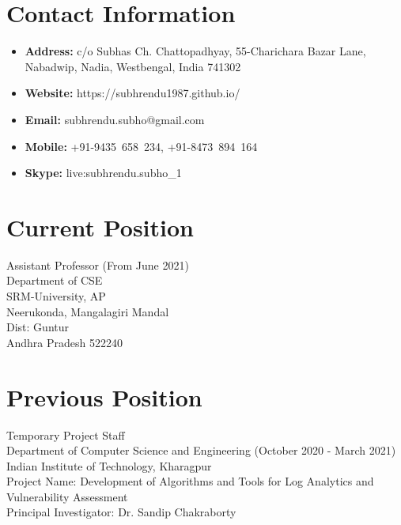 \documentclass{article}
\begin{document}
 
\begin{center}
	\Large{\bf \name}
\end{center}
%                                  

 \noindent\makebox[\linewidth]{\rule{\textwidth}{0.4pt}}
\section{Contact Information}
	\begin{itemize}
		\item {\bf Address:} c/o Subhas Ch. Chattopadhyay, 55-Charichara Bazar Lane, Nabadwip, Nadia, Westbengal, India 741302
		\item {\bf Website:} https://subhrendu1987.github.io/
		\item {\bf Email:} subhrendu.subho@gmail.com
		\item {\bf Mobile:} +91-9435~658~234, +91-8473~894~164
		\item {\bf Skype:} live:subhrendu.subho\_1
	\end{itemize}
\section{Current Position}          
	Assistant Professor (From June 2021)\\
	Department of CSE\\
	SRM-University, AP\\
	Neerukonda, Mangalagiri Mandal\\
	Dist: Guntur\\
	Andhra Pradesh 522240
\section{Previous Position}
	Temporary Project Staff\\
	Department of Computer Science and Engineering (October 2020 - March 2021)\\
	Indian Institute of Technology, Kharagpur\\
	Project Name: Development of Algorithms and Tools for Log Analytics  and Vulnerability Assessment \\
	Principal Investigator: Dr. Sandip Chakraborty
\end{document}
